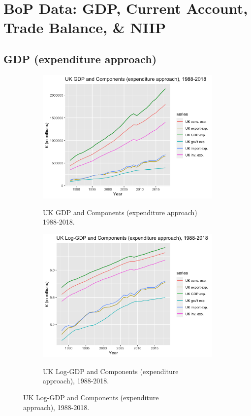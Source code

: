 \documentclass[12pt]{article}
\begin{document}
\newpage
\section{BoP Data: GDP, Current Account, Trade Balance, \& NIIP}

\subsection{GDP (expenditure approach)}

\begin{figure}[h!]
\centering
\begin{subfigure}{.5\textwidth}
  \centering
\includegraphics[scale=0.45]{1.png}
\label{}
\caption{UK GDP and Components (expenditure approach) \\ 1988-2018.}
\end{subfigure}%
\begin{subfigure}{.5\textwidth}
  \centering
\includegraphics[scale=0.45]{1a.png}
\label{}
\caption{UK Log-GDP and Components (expenditure \\ approach), 1988-2018.}
\end{subfigure}
\end{figure}
\end{document}
